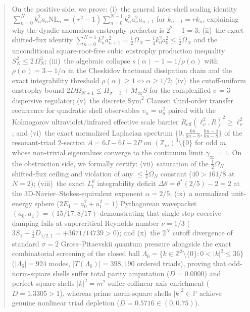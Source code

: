 \documentclass[11pt,a4paper]{article}
\theoremstyle{definition}
\theoremstyle{remark}
\begin{document}
\begin{abstract}
On the positive side, we prove: (i)~the general inter-shell scaling identity $\sum_{n=0}^N k_n^2 a_n \mathrm{NL}_n = \mbox{$(r^2-1)$}\sum_{n=0}^{N-1} k_n^3 a_n^2 a_{n+1}$ for $k_{n+1} = r k_n$, explaining why the dyadic anomalous enstrophy prefactor is $2^2-1=3$; (ii)~the exact shifted-flux identity $\sum_{n=0}^{N-1} k_n^2 a_{n+1}^2 = \frac{1}{2}\Omega_N - \frac{1}{4}k_0^2 a_0^2 \le \frac{1}{2}\Omega_N$ and the unconditional square-root-free cubic enstrophy production inequality $S_N^2 \le 2\,\Omega_N^3$; (iii)~the algebraic collapse $s(\alpha)-1 = 1/\rho(\alpha)$ with $\rho(\alpha)=3-1/\alpha$ in the Cheskidov fractional dissipation chain and the exact integrability threshold $\rho(\alpha) \ge 1 \iff \alpha \ge 1/2$; (iv)~the cutoff-uniform enstrophy bound $2D\Omega_{N+1} \le H_{\sigma=3} + M_\infty S$ for the complexified $\sigma=3$ dispersive regulator; (v)~the discrete $\mathrm{Sym}^2$ Clausen third-order transfer recurrence for quadratic shell observables $v_n = u_n^2$ paired with the Kolmogorov ultraviolet/infrared effective scale barrier $R_{\mathrm{eff}}(\ell_\nu^2, R)^2 \ge \ell_\nu^2$; and (vi)~the exact normalized Laplacian spectrum $\{0, \frac{6n}{6n-8}, \frac{6n-4}{6n-8}\}$ of the resonant-triad $2$-section $A = 6J - 6I - 2P$ on $(\mathbb{Z}_m)^3 \setminus \{0\}$ for odd $m$, whose non-trivial eigenvalues converge to the continuum limit $\gamma_\infty = 1$. On the obstruction side, we formally certify: (vii)~saturation of the $\frac{1}{2}\Omega_N$ shifted-flux ceiling and violation of any $\le \frac{1}{4}\Omega_N$ constant ($40 > 161/8$ at $N=2$); (viii)~the exact $L^\theta_t$ integrability deficit $\Delta\theta = \theta^*(2/5)-2 = 2$ at the 3D-Navier--Stokes-equivalent exponent $\alpha=2/5$; (ix)~a normalized unit-energy sphere ($2E_1 = a_0^2+a_1^2 = 1$) Pythagorean wavepacket $(a_0,a_1)=(15/17, 8/17)$ demonstrating that single-step coercive damping fails at supercritical Reynolds number $\nu = 1/3$ ($3S_1 - \frac{1}{3}D_{1/2,1} = +3671/14739 > 0$); and (x)~the $2^N$ cutoff divergence of standard $\sigma=2$ Gross--Pitaevskii quantum pressure alongside the exact combinatorial screening of the closed ball $\Lambda_6 = \{k \in \mathbb{Z}^3 \setminus \{0\} : 0 < |k|^2 \le 36\}$ ($|\Lambda_6|=924$ modes, $|T(\Lambda_6)|=398{,}190$ ordered triads), proving that odd-norm-square shells suffer total parity amputation ($D=0.0000$) and perfect-square shells $|k|^2=m^2$ suffer collinear axis enrichment ($D=1.3305 > 1$), whereas prime norm-square shells $|k|^2 \in \mathbb{P}$ achieve genuine nonlinear triad depletion ($D = 0.5716 \in (0, 0.75)$).
\end{abstract}
\end{document}
